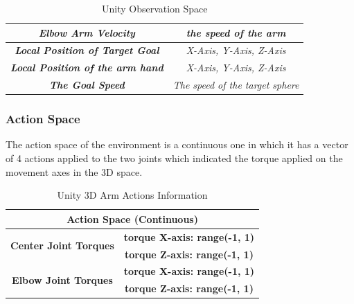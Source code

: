 \begin{table}[!htb]
\begin{tabular}{|c|l|l|c|}
						\multicolumn{3}{|c|}{\textit{\textbf{Elbow Arm Velocity}}}                      & \textit{the speed of the arm}                                                                            \\ \hline
				\multicolumn{3}{|c|}{\textit{\textbf{Local Position of Target Goal}}}      & \textit{X-Axis, Y-Axis, Z-Axis}                                                                          \\ \hline
				\multicolumn{3}{|c|}{\textit{\textbf{Local Position of the arm hand}}}      & \textit{X-Axis, Y-Axis, Z-Axis}                                                                          \\ \hline
				\multicolumn{3}{|c|}{\textit{\textbf{The Goal Speed}}}                         & \textit{The speed of the target sphere}                                                                  \\ \hline
		\end{tabular}
		\caption{Unity Observation Space}
		\label{tab:unity_obs_space}
\end{table}

\subsubsection{Action Space}

The action space of the environment is a continuous one in which it has a vector of 4 actions applied to the two joints which indicated the torque applied on the movement axes in the 3D space.


\begin{table}[!htb]
		\centering

		\begin{tabular}{|c|c|l|l|}
				\hline
				\multicolumn{4}{|c|}{\textbf{Action Space (Continuous)}}                                                    \\ \hline
				\multirow{2}{*}{\textbf{Center Joint Torques}}  & \multicolumn{3}{c|}{\textbf{torque X-axis: range(-1, 1)}} \\ \cline{2-4} 
																										& \multicolumn{3}{c|}{\textbf{torque Z-axis: range(-1, 1)}} \\ \hline
				\multirow{2}{*}{\textbf{Elbow Joint Torques}}   & \multicolumn{3}{c|}{\textbf{torque X-axis: range(-1, 1)}} \\ \cline{2-4} 
																										& \multicolumn{3}{c|}{\textbf{torque Z-axis: range(-1, 1)}} \\ \hline
		\end{tabular}
		\caption{Unity 3D Arm Actions Information}
		\label{tab:unity_arm_actions}

\end{table}

